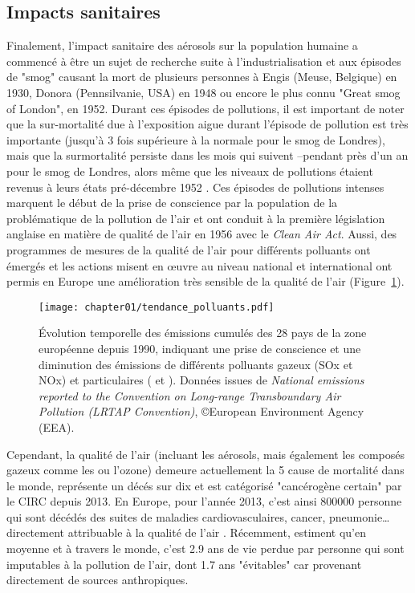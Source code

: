 \subsection{Impacts sanitaires}%
\label{sub:impacts_sanitaires}

Finalement, l'impact sanitaire des aérosols sur la population humaine a commencé à être
un sujet de recherche suite à l'industrialisation et aux épisodes de "smog" causant la
mort de plusieurs personnes à Engis (Meuse, Belgique) en 1930, Donora (Pennsilvanie, USA)
en 1948 ou encore le plus connu "Great smog of London", en 1952. Durant ces épisodes de
pollutions, il est important de noter que la sur-mortalité due à l'exposition aigue
durant l'épisode de pollution est très importante (jusqu'à 3 fois supérieure à la normale
pour le smog de Londres), mais que la surmortalité persiste dans les mois qui suivent
--pendant près d'un an pour le smog de Londres, alors même que les niveaux de pollutions
étaient revenus à leurs états pré-décembre 1952 \autocite{bellReassessment2001}.  Ces
épisodes de pollutions intenses marquent le début de la prise de conscience par la
population de la problématique de la pollution de l'air et ont conduit à la première
législation anglaise en matière de qualité de l'air en 1956 avec le \textit{Clean Air
Act}. Aussi, des programmes de mesures de la qualité de l'air pour différents polluants
ont émergés et les actions misent en œuvre au niveau national et international ont permis
en Europe une amélioration très sensible de la qualité de l'air
(Figure~\ref{fig:chapter01/tendance_polluants}).

\begin{figure}[ht]
    \centering
    \texttt{[image: chapter01/tendance\_polluants.pdf]}
    \caption{Évolution temporelle des émissions cumulés des 28 pays de la zone européenne
    depuis 1990, indiquant une prise de conscience et une diminution des émissions de
différents polluants gazeux (SOx et NOx) et particulaires (\PMdix{} et \PMdc). Données
issues de \textit{National emissions reported to the Convention on Long-range
Transboundary Air Pollution (LRTAP Convention)}, ©European Environment Agency (EEA).}%
\label{fig:chapter01/tendance_polluants}
\end{figure}


Cependant, la qualité de l'air (incluant les aérosols, mais également les
composés gazeux comme les  ou l'ozone) demeure actuellement la 5\ieme{} cause de
mortalité dans le monde, représente un décés sur dix et est catégorisé "cancérogène
certain" par le CIRC depuis 2013. En Europe, pour l'année 2013, c'est
ainsi \num{800000} personne qui sont décédés des suites de maladies cardiovasculaires,
cancer, pneumonie… directement attribuable à la qualité de l'air
\autocite{worldhealthorganizationAmbient2016}. Récemment, \textcite{lelieveldLoss2020}
estiment qu'en moyenne et à travers le monde, c'est 2.9 ans de vie perdue par personne
qui sont imputables à la pollution de l'air, dont 1.7 ans "évitables" car provenant
directement de sources anthropiques.

